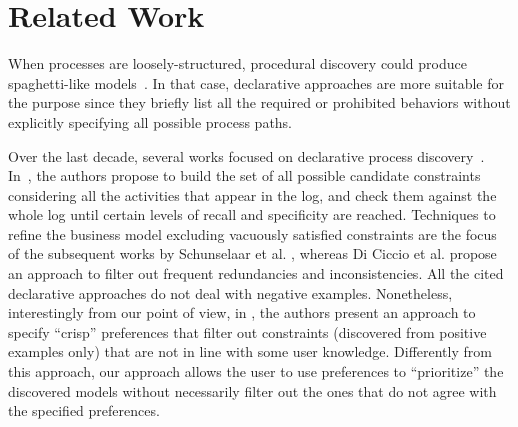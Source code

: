 
\section{Related Work}
\label{sec:related}


When processes are loosely-structured, procedural discovery could produce spaghetti-like models~\cite{2012-Maggi,deviant-tkde}. In that case, declarative approaches are more suitable for the purpose since they briefly list all the required or prohibited behaviors without explicitly specifying all possible process paths. 

Over the last decade, several works focused on declarative process discovery~\cite{2018a-Maggi,DBLP:journals/is/CiccioMM16,2012-Schunselaar,2017-DiCiccio}.
In~\cite{2018a-Maggi,DBLP:journals/is/CiccioMM16}, the authors propose to build the set of all possible candidate \declare constraints considering all the activities that appear in the log, and check them against the whole log until certain levels of recall and specificity are reached. 
Techniques to refine the business model excluding vacuously satisfied constraints are the focus of the subsequent works by Schunselaar et al. \cite{2012-Schunselaar}, whereas Di Ciccio et al. \cite{2017-DiCiccio} propose an approach to filter out frequent redundancies and inconsistencies. 
All the cited declarative approaches do not deal with negative examples. Nonetheless, interestingly from our point of view, in \cite{DBLP:conf/caise/MaggiBA13},  the authors present an approach to specify ``crisp'' preferences that filter out constraints (discovered from positive examples only) that are not in line with some user knowledge. Differently from this approach, our approach allows the user to use preferences to ``prioritize'' the discovered models without necessarily filter out the ones that do not agree with the specified preferences. 


